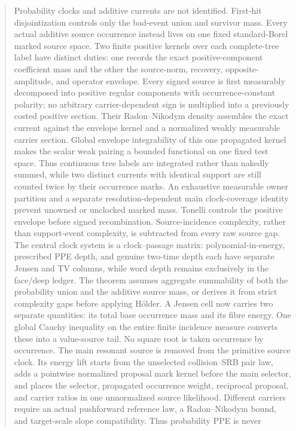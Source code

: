 \documentclass[11pt]{article}
\begin{document}
\begin{abstract}
Probability clocks and additive currents are not identified.  First-hit
disjointization controls only the bad-event union and survivor mass.  Every
actual additive source occurrence instead lives on one fixed standard-Borel
marked source space.  Two finite positive kernels over each complete-tree
label have distinct duties: one records the exact positive-component
coefficient mass and the
other the source-norm, recovery, opposite-amplitude, and operator envelope.
Every signed source is first measurably decomposed into positive regular
components with occurrence-constant polarity; no arbitrary carrier-dependent
sign is multiplied into a previously costed positive section.  Their
Radon--Nikodym density assembles the exact current against the envelope
kernel and a normalized weakly measurable carrier section.  Global envelope
integrability of this one propagated kernel makes the scalar weak pairing a bounded
functional on one fixed test space.  Thus continuous tree labels are
integrated rather than nakedly summed, while two distinct currents with
identical support are still counted twice by their occurrence marks.  An
exhaustive measurable owner partition and a separate resolution-dependent
main clock-coverage identity prevent unowned or unclocked marked mass.
Tonelli controls the positive envelope before signed recombination.  Source-incidence
complexity, rather than support-event complexity, is subtracted from every
raw source gap.  The central clock system is a clock--passage matrix:
polynomial-in-energy, prescribed PPE depth, and genuine two-time depth each
have separate Jensen and TV columns, while word depth remains exclusively in
the face/deep ledger.  The theorem assumes aggregate summability of both the
probability union and the additive source mass, or derives it from strict
complexity gaps before applying H\"older.  A Jensen cell now carries two
separate quantities: its total base occurrence mass and its fibre energy.
One global Cauchy inequality on the entire finite incidence measure converts
these into a value-source tail.  No square root is taken occurrence by
occurrence.  The main resonant source is removed from the primitive source
clock.  Its energy lift starts from the unselected collision--SRB pair law,
adds a pointwise normalized proposal mark kernel before the main selector,
and places the selector, propagated occurrence weight, reciprocal proposal,
and carrier ratios in one unnormalized source likelihood.  Different
carriers require an actual pushforward reference law, a Radon--Nikodym bound,
and target-scale slope compatibility.  Thus probability PPE is never

\end{abstract}
\end{document}
